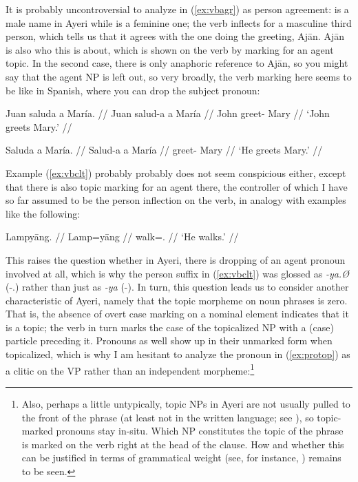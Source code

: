 \xe

It is probably uncontroversial to analyze  in (\ref{ex:vbagr}) as 
person agreement:  is a male name in Ayeri while 
 is a feminine one; the verb inflects for a masculine third 
person, which tells us that it agrees with the one doing the greeting, 
Ajān. Ajān is also who this is about, which is shown on the verb by marking for 
an agent topic. In the second case, there is only anaphoric reference to Ajān, 
so you might say that the agent NP is left out, so very broadly, the verb 
marking here seems to be like in Spanish, where you can drop the subject 
pronoun:

\pex %
\a\label{ex:vbagrspann}\begingl{}%
	\gla Juan saluda a María. //
	\glb Juan salud-a a María //
	\glc John greet-\Tsg{} \Acc{} Mary //
	\glft `John greets Mary.' //
\endgl

\a\label{ex:vbagrspapr}\begingl
	\gla Saluda a María. //
	\glb Salud-a a María //
	\glc greet-\Tsg{} \Acc{} Mary //
	\glft `He greets Mary.' //
\endgl

\xe

Example (\ref{ex:vbclt}) probably probably does not seem conspicious either, 
except that there is also topic marking for an agent there, the controller of 
which I have so far assumed to be the person inflection on the verb, in analogy 
with examples like the following:

\ex\label{ex:lampyaang} %
\begingl
	\gla Lampyāng. //
	\glb Lamp=yāng //
	\glc walk=\TsgM{}.\Aarg{} //
	\glft `He walks.' //
\endgl\xe

This raises the question whether in Ayeri, there is dropping of an agent 
pronoun involved at all, which is why the person suffix in (\ref{ex:vbclt}) was 
glossed as \emph{-ya.Ø} (\mbox{-\TsgM{}.\Top{}}) rather than just as \emph{-ya} 
(-\TsgM{}). In turn, this question leads us to consider another characteristic 
of Ayeri, namely that the topic morpheme on noun phrases is zero. That is, the 
absence of overt case marking on a nominal element indicates that it is a 
topic; the verb in turn marks the case of the topicalized NP with a (case) 
particle preceding it. Pronouns as well show up in their unmarked form when 
topicalized, which is why I am hesitant to analyze the pronoun in 
(\ref{ex:protop}) as a clitic on the VP rather than an independent 
morpheme:\footnote{Also, perhaps a little untypically, topic NPs in Ayeri are 
not usually pulled to the front of the phrase (at least not in the written 
language; see \citet[120--122]{lehmann2015}), so topic-marked pronouns stay 
in-situ. Which NP constitutes the topic of the phrase is marked on the verb 
right at the head of the clause. How and whether this can be justified in terms 
of grammatical weight (see, for instance, \citet[95--98]{wasow1997}) remains to 
be seen.}


